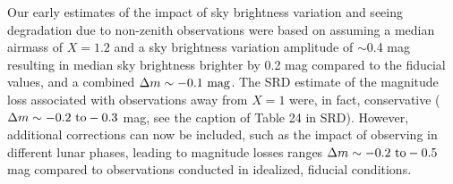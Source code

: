 \documentclass[PST,authoryear,toc]{lsstdoc}
\begin{document}
Our early estimates of the impact of sky brightness variation and
seeing degradation due to non-zenith observations were based on
assuming a median airmass of $X=1.2$ and a sky brightness variation
amplitude of $\sim$0.4 mag resulting in median sky brightness brighter
by 0.2 mag compared to the fiducial values, and a combined $\Delta m \sim-0.1 {~\rm mag}$. The SRD estimate of the magnitude loss associated with observations away from $X=1$ were, in fact, conservative ($\Delta m\sim -0.2\ {\rm to} -0.3$ mag, see the caption of Table 24 in SRD). However, additional corrections can now be included, such as the impact of observing in different lunar phases, leading to magnitude losses ranges $\Delta m\sim -0.2\ {\rm to} -0.5$ mag compared to observations conducted in idealized, fiducial conditions.
\end{document}
